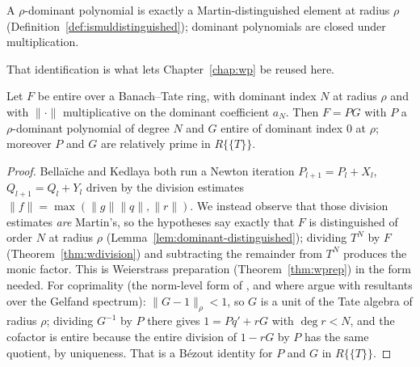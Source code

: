 \begin{lemma}
  \label{lem:dominant-distinguished}
  \leanok
  A $\rho$-dominant polynomial is exactly a Martin-distinguished element at radius $\rho$
  (Definition~\ref{def:ismuldistinguished}); dominant polynomials are closed under
  multiplication.
\end{lemma}

That identification is what lets Chapter~\ref{chap:wp} be reused here.

\begin{theorem}
  \label{thm:slope-factorisation}
  \leanok
  Let $F$ be entire over a Banach--Tate ring, with dominant index $N$ at radius $\rho$ and with
  $\lVert\cdot\rVert$ multiplicative on the dominant coefficient $a_N$.  Then $F = PG$ with $P$
  a $\rho$-dominant polynomial of degree $N$ and $G$ entire of dominant index $0$ at $\rho$;
  moreover $P$ and $G$ are relatively prime in $R\{\{T\}\}$.
\end{theorem}

\begin{proof}
  \leanok
  Bella\"iche and Kedlaya \cite[Proposition 3.2.2]{Kedlaya} both run a Newton iteration
  $P_{l+1} = P_l + X_l$, $Q_{l+1} = Q_l + Y_l$ driven by the division estimates
  $\lVert f\rVert = \max(\lVert g\rVert\lVert q\rVert, \lVert r\rVert)$.  We instead observe that
  those division estimates \emph{are} Martin's, so the hypotheses say exactly that $F$ is
  distinguished of order $N$ at radius $\rho$ (Lemma~\ref{lem:dominant-distinguished}); dividing
  $T^N$ by $F$ (Theorem~\ref{thm:wdivision}) and subtracting the remainder from $T^N$ produces
  the monic factor.  This is Weierstrass preparation (Theorem~\ref{thm:wprep}) in the form
  needed.  For coprimality (the norm-level form of \cite[Lemma 2.2.7]{JN}, and where \cite{JN}
  argue with resultants over the Gelfand spectrum): $\lVert G-1\rVert_\rho < 1$, so $G$ is a unit
  of the Tate algebra of radius $\rho$; dividing $G^{-1}$ by $P$ there gives
  $1 = Pq' + rG$ with $\deg r < N$, and the cofactor is entire because the entire division of
  $1 - rG$ by $P$ has the same quotient, by uniqueness.  That is a B\'ezout identity for $P$ and
  $G$ in $R\{\{T\}\}$.
\end{proof}


